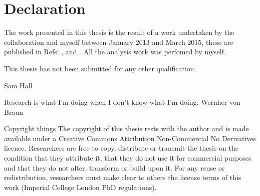 \clearpage
\chapter*{\centering Declaration}

The work presented in this thesis is the result of a work undertaken by the
\lhcb collaboration and myself between January 2013 and March 2015, these are
published in Refs: \xxx, \xxx and \xxx.
All the analysis work was perfomed by myself.

This thesis has not been submitted for any other qualification.

{\flushright Sam Hall \xxx}

\vspace{5em}
Research is what I'm doing when I don't know what I'm doing.
Wernher von Braun

\vfill
Copyright things
The copyright of this thesis rests with the author and is made available under a Creative Commons
Attribution Non-Commercial No Derivatives licence. Researchers are free to copy, distribute or
transmit the thesis on the condition that they attribute it, that they do not use it for commercial
purposes and that they do not alter, transform or build upon it. For any reuse or redistribution,
researchers must make clear to others the license terms of this work (Imperial College London PhD
regulations).
